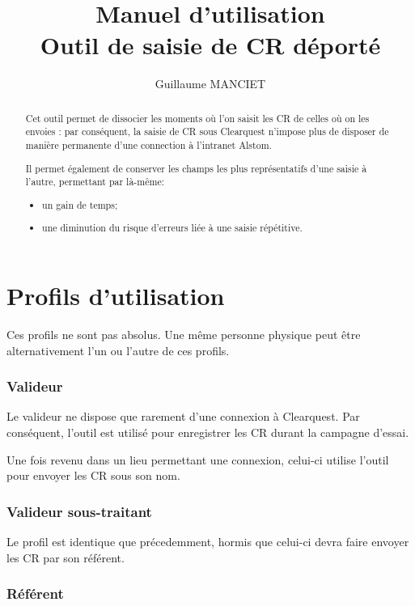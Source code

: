 \documentclass[11pt,a4paper,final]{article}
\author{Guillaume MANCIET}
\title{Manuel d'utilisation\\\textbf{Outil de saisie de CR déporté}}
\begin{document}
\maketitle

\begin{abstract}
Cet outil permet de dissocier les moments où l'on saisit les CR de celles où on les envoies : par conséquent, la saisie de CR sous Clearquest n'impose plus de disposer de manière permanente d'une connection à l'intranet Alstom.

Il permet également de conserver les champs les plus représentatifs d'une saisie à l'autre, permettant par là-même:
\begin{itemize}
\item un gain de temps;
\item une diminution du risque d'erreurs liée à une saisie répétitive. 
\end{itemize}
 
\end{abstract}

\tableofcontents

\part{Profils d'utilisation}

Ces profils ne sont pas absolus. Une même personne physique peut être alternativement l'un ou l'autre de ces profils.

\section{Valideur}

Le valideur ne dispose que rarement d'une connexion à Clearquest. Par conséquent, l'outil est utilisé pour enregistrer les CR durant la campagne d'essai. 

Une fois revenu dans un lieu permettant une connexion, celui-ci utilise l'outil pour envoyer les CR sous son nom.

\section{Valideur sous-traitant}

Le profil est identique que précedemment, hormis que celui-ci devra faire envoyer les CR par son référent.

\section{Référent}
\end{document}
